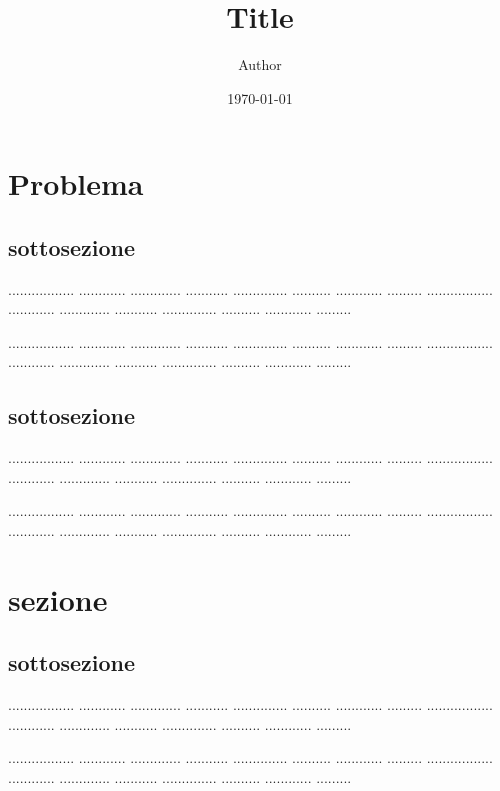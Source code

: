 \documentclass[12pt, a4paper]{article}
\title{Title}           %
\author{Author}         %
\date{\today}           %
\begin{document}
\maketitle      %


\section{Problema}
\subsection{sottosezione}

................. ............ ............. ........... .............. .......... ............ ......... ................. ............ ............. ........... .............. .......... ............ .........

................. ............ ............. ........... .............. .......... ............ ......... ................. ............ ............. ........... .............. .......... ............ .........

\subsection{sottosezione}
................. ............ ............. ........... .............. .......... ............ ......... ................. ............ ............. ........... .............. .......... ............ .........

................. ............ ............. ........... .............. .......... ............ ......... ................. ............ ............. ........... .............. .......... ............ .........

\section*{sezione}                  %
\subsection*{sottosezione}
................. ............ ............. ........... .............. .......... ............ ......... ................. ............ ............. ........... .............. .......... ............ .........

................. ............ ............. ........... .............. .......... ............ ......... ................. ............ ............. ........... .............. .......... ............ .........

\end{document}
